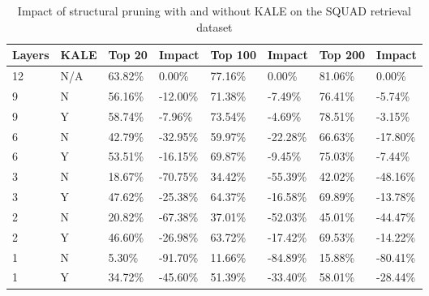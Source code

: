 \begin{table*}[!ht]
    \centering
    \begin{tabular}{|l|l|l|l|l|l|l|l|}
    \hline
        Layers & KALE & Top 20 & Impact & Top 100 & Impact & Top 200 & Impact \\ \hline
        12 & N/A & 63.82\% & 0.00\% & 77.16\% & 0.00\% & 81.06\% & 0.00\% \\ \hline
        9 & N & 56.16\% & -12.00\% & 71.38\% & -7.49\% & 76.41\% & -5.74\% \\ \hline
        9 & Y & 58.74\% & -7.96\% & 73.54\% & -4.69\% & 78.51\% & -3.15\% \\ \hline
        6 & N & 42.79\% & -32.95\% & 59.97\% & -22.28\% & 66.63\% & -17.80\% \\ \hline
        6 & Y & 53.51\% & -16.15\% & 69.87\% & -9.45\% & 75.03\% & -7.44\% \\ \hline
        3 & N & 18.67\% & -70.75\% & 34.42\% & -55.39\% & 42.02\% & -48.16\% \\ \hline
        3 & Y & 47.62\% & -25.38\% & 64.37\% & -16.58\% & 69.89\% & -13.78\% \\ \hline
        2 & N & 20.82\% & -67.38\% & 37.01\% & -52.03\% & 45.01\% & -44.47\% \\ \hline
        2 & Y & 46.60\% & -26.98\% & 63.72\% & -17.42\% & 69.53\% & -14.22\% \\ \hline
        1 & N & 5.30\% & -91.70\% & 11.66\% & -84.89\% & 15.88\% & -80.41\% \\ \hline
        1 & Y & 34.72\% & -45.60\% & 51.39\% & -33.40\% & 58.01\% & -28.44\% \\ \hline
    \end{tabular}
    \caption{Impact of structural pruning with and without KALE on the SQUAD retrieval dataset}
    \label{tab:kale-squad}
\end{table*}
